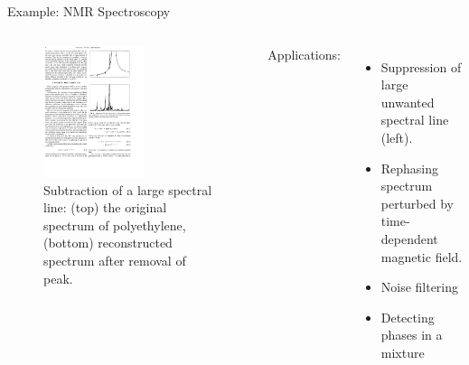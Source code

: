 \documentclass[aspectratio=169]{beamer}
\begin{document}
\begin{frame}{Example: NMR Spectroscopy}
\begin{columns}
\begin{figure}
    \centering
    \includegraphics[width=0.6\textwidth]{figures/nmrwavelet.pdf}
    \caption{Subtraction of a large spectral line: (top) the original spectrum of polyethylene, (bottom) reconstructed spectrum after removal of  peak.\cite{baracheContinuousWaveletTransform1997}}
\end{figure}
    Applications:
    \begin{itemize}
        \item Suppression of large unwanted spectral line (left).
        \item Rephasing spectrum perturbed by time-dependent magnetic field.
        \item Noise filtering
        \item Detecting phases in a mixture
    \end{itemize}
\end{columns}
\end{frame} 
\end{document}
